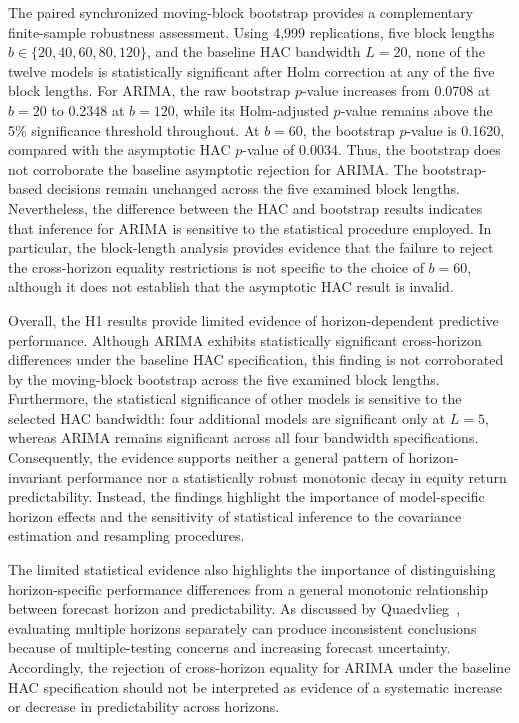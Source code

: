 \documentclass[runningheads,orivec]{llncs}
\begin{document}
The paired synchronized moving-block bootstrap provides a complementary finite-sample robustness assessment. Using 4,999 replications, five block lengths $b\in\{20,40,60,80,120\}$, and the baseline HAC bandwidth $L=20$, none of the twelve models is statistically significant after Holm correction at any of the five block lengths. For ARIMA, the raw bootstrap $p$-value increases from 0.0708 at $b=20$ to 0.2348 at $b=120$, while its Holm-adjusted $p$-value remains above the 5\% significance threshold throughout. At $b=60$, the bootstrap $p$-value is 0.1620, compared with the asymptotic HAC $p$-value of 0.0034. Thus, the bootstrap does not corroborate the baseline asymptotic rejection for ARIMA. The bootstrap-based decisions remain unchanged across the five examined block lengths. Nevertheless, the difference between the HAC and bootstrap results indicates that inference for ARIMA is sensitive to the statistical procedure employed. In particular, the block-length analysis provides evidence that the failure to reject the cross-horizon equality restrictions is not specific to the choice of $b=60$, although it does not establish that the asymptotic HAC result is invalid.

Overall, the H1 results provide limited evidence of horizon-dependent predictive performance. Although ARIMA exhibits statistically significant cross-horizon differences under the baseline HAC specification, this finding is not corroborated by the moving-block bootstrap across the five examined block lengths. Furthermore, the statistical significance of other models is sensitive to the selected HAC bandwidth: four additional models are significant only at $L=5$, whereas ARIMA remains significant across all four bandwidth specifications. Consequently, the evidence supports neither a general pattern of horizon-invariant performance nor a statistically robust monotonic decay in equity return predictability. Instead, the findings highlight the importance of model-specific horizon effects and the sensitivity of statistical inference to the covariance estimation and resampling procedures.

The limited statistical evidence also highlights the importance of distinguishing horizon-specific performance differences from a general monotonic relationship between forecast horizon and predictability. As discussed by Quaedvlieg~\cite{quaedvlieg2021}, evaluating multiple horizons separately can produce inconsistent conclusions because of multiple-testing concerns and increasing forecast uncertainty. Accordingly, the rejection of cross-horizon equality for ARIMA under the baseline HAC specification should not be interpreted as evidence of a systematic increase or decrease in predictability across horizons.
\end{document}
